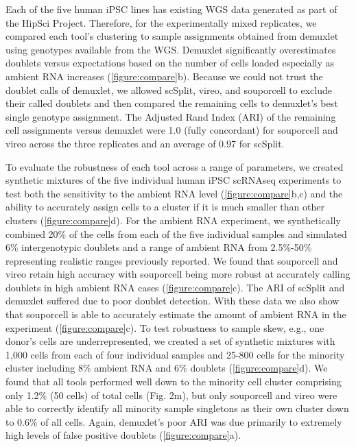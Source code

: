\par{
Each of the five human iPSC lines has existing WGS data generated as part of the HipSci Project\cite{hipsci2}. Therefore, for the experimentally mixed replicates, we compared each tool's clustering to sample assignments obtained from demuxlet using genotypes available from the WGS. Demuxlet significantly overestimates doublets versus expectations based on the number of cells loaded\cite{10xsinglecell} especially as ambient RNA increases (\ref{figure:compare}b). Because we could not trust the doublet calls of demuxlet, we allowed scSplit, vireo, and souporcell to exclude their called doublets and then compared the remaining cells to demuxlet's best single genotype assignment. The Adjusted Rand Index (ARI) of the remaining cell assignments versus demuxlet were 1.0 (fully concordant) for souporcell and vireo across the three replicates and an average of 0.97 for scSplit.
} \\

\par{
To evaluate the robustness of each tool across a range of parameters, we created synthetic mixtures of the five individual human iPSC scRNAseq experiments to test both the sensitivity to the ambient RNA level (\ref{figure:compare}b,c) and the ability to accurately assign cells to a cluster if it is much smaller than other clusters (\ref{figure:compare}d). For the ambient RNA experiment, we synthetically combined 20\% of the cells from each of the five individual samples and simulated 6\% intergenotypic doublets and a range of ambient RNA from 2.5\%-50\% representing realistic ranges previously reported\cite{soupx}. We found that souporcell and vireo retain high accuracy with souporcell being more robust at accurately calling doublets in high ambient RNA cases (\ref{figure:compare}c). The ARI of scSplit and demuxlet suffered due to poor doublet detection. With these data we also show that souporcell is able to accurately estimate the amount of ambient RNA in the experiment (\ref{figure:compare}c). To test robustness to sample skew, e.g., one donor's cells are underrepresented, we created a set of synthetic mixtures with 1,000 cells from each of four individual samples and 25-800 cells for the minority cluster including 8\% ambient RNA and 6\% doublets (\ref{figure:compare}d). We found that all tools performed well down to the minority cell cluster comprising only 1.2\% (50 cells) of total cells (Fig. 2m), but only souporcell and vireo were able to correctly identify all minority sample singletons as their own cluster down to 0.6\% of all cells. Again, demuxlet's poor ARI was due primarily to extremely high levels of false positive doublets (\ref{figure:compare}a).
}


